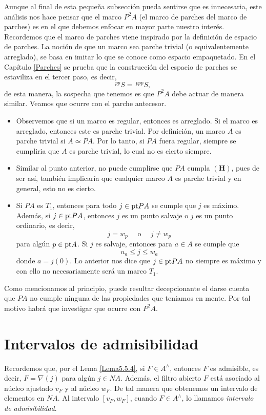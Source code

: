 Aunque al final de esta pequeña subsección pueda sentirse que es innecesaria, este análisis nos hace pensar que el marco $P^2A$ (el marco de parches del marco de parches) es en el que debemos enfocar en mayor parte nuestro interés. Recordemos que el marco de parches viene inspirado por la definición de espacio de parches.
La noción de que un marco sea parche trivial (o equivalentemente arreglado), se basa en imitar lo que se conoce como espacio empaquetado. En el Capítulo \ref{Parches} se prueba que la construcción del espacio de parches se estaviliza en el tercer paso, es decir,
\[
^{pp}S=\,^{ppp}S,
\]
de esta manera, la sospecha que tenemos es que $P^2A$ debe actuar de manera similar. Veamos que ocurre con el parche antecesor.\\

\begin{itemize}
\item Observemos que si un marco es regular, entonces es arreglado. Si el marco es arreglado, entonces este es parche trivial. Por definición, un marco $A$ es parche trivial si $A\simeq PA$. Por lo tanto, si $PA$ fuera regular, siempre se cumpliria que $A$ es parche trivial, lo cual no es cierto siempre.
\item Similar al punto anterior, no puede cumplirse que $PA$ cumpla $\mathbf{(H)}$, pues de ser así, también implicaría que cualquier marco $A$ es parche trivial y en general, esto no es cierto.
\item Si $PA$ es $T_1$, entonces para todo $j\in \mathrm{pt} PA$ se cumple que $j$ es máximo. Además, si $j\in \mathrm{pt} PA$, entonces $j$ es un punto salvaje o $j$ es un punto ordinario, es decir,
\[
j=w_p\quad \mbox{ o }\quad j\neq w_p
\]
para algún $p\in \mathrm{pt} A$. Si $j$ es salvaje, entonces para $a\in A$ se cumple que 
\[
u_a\leq j\leq w_a
\]
donde $a=j(0)$. Lo anterior nos dice que $j\in \mathrm{pt} PA$ no siempre es máximo y con ello no necesariamente será un marco $T_1$.
\end{itemize}

Como mencionamos al principio, puede resultar decepcionante el darse cuenta que $PA$ no cumple ninguna de las propiedades que teniamos en mente. Por tal motivo habrá que investigar que ocurre con $P^2A$.

\section{Intervalos de admisibilidad}

Recordemos que, por el Lema \ref{Lema5.5.4}, si $F\in A^\wedge$, entonces $F$ es admisible, es decir, $F=\nabla(j)$ para algún $j\in NA$. Además, el filtro abierto $F$ está asociado al núcleo ajustado $v_F$ y al núcleo $w_F$. De tal manera que obtenemos un intervalo de elementos en $NA$. Al intervalo $[v_F, w_F]$, cuando $F\in A^\wedge$, lo llamamos \emph{intervalo de admisibilidad}.\\

